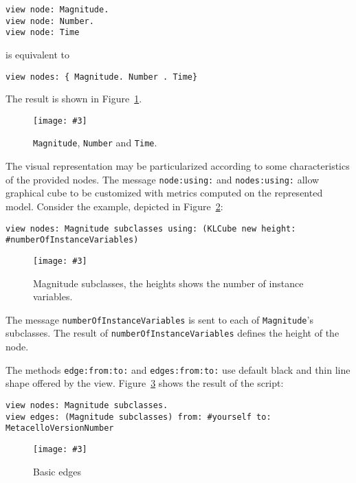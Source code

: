 \documentclass{sig-alternate}
\newcommand{\ct}{\lstinline[backgroundcolor=\color{white},basicstyle=\footnotesize\ttfamily]}
\newcommand{\rj}[1]{\nb{Ricardo}{green}{#1}}
\newcommand{\fig}[4]{
	\begin{figure}[#1]
		\centering
		\texttt{[image: \#3]}
		\caption{\label{fig:#3}#4}
	\end{figure}}
\newcommand{\figref}[1]{Figure~\ref{fig:#1}}
\begin{document}
\begin{lstlisting}
view node: Magnitude.
view node: Number.
view node: Time    
\end{lstlisting}

is equivalent to

\begin{lstlisting}
view nodes: { Magnitude. Number . Time}
\end{lstlisting}

The result is shown in \figref{figure2.png}.

\fig{h!}{0.2}{figure2.png}{\ct{Magnitude}, \ct{Number} and \ct{Time}.}

The visual representation may be particularized according to some characteristics of the provided nodes. The message \ct{node:using:} and \ct{nodes:using:} allow graphical cube to be customized with metrics computed on the represented model. Consider the example, depicted in \figref{figure3.png}:

\begin{lstlisting}
view nodes: Magnitude subclasses using: (KLCube new height: #numberOfInstanceVariables)    
\end{lstlisting}

\fig{h}{0.3}{figure3.png}{Magnitude subclasses, the heights shows the number of instance variables.}

The message \ct{numberOfInstanceVariables} is sent to each of \ct{Magnitude}'s subclasses. The result of \texttt{number\-Of\-Instance\-Variables} defines the height of the node.

The methods \ct{edge:from:to:} and \ct{edges:from:to:} use default black and thin line shape offered by the view. \figref{figure4.png} shows the result of the script:

\begin{lstlisting}
view nodes: Magnitude subclasses.	
view edges: (Magnitude subclasses) from: #yourself to: MetacelloVersionNumber
\end{lstlisting}
\fig{h}{0.3}{figure4.png}{Basic edges}


 
\end{document}
